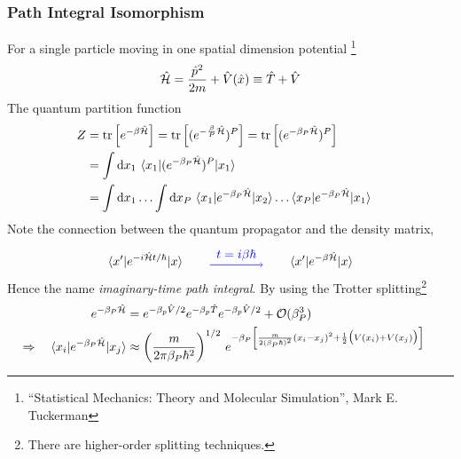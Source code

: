 \begin{frame}[allowframebreaks]
  \frametitle{Path Integral Isomorphism}
  For a single particle moving in one spatial dimension potential
  \footnote[frame]{
   ``Statistical Mechanics: Theory and Molecular Simulation'', Mark E. Tuckerman 
  }
  $$
  \hat{\cal H} = \frac{\hat{p}^2}{2m} + \hat{V}(\hat{x}) \equiv \hat{T} + \hat{V}
  $$
  The quantum partition function
  \begin{align*}
    \label{eq:quantum_partition_function}
    Z &= \operatorname{tr}\left[e^{-\beta\hat{\cal H}}\right]
        = \operatorname{tr}\left[(e^{-{\beta\over P}\hat{\cal H}})^P\right]
        = \operatorname{tr}\left[(e^{-{\beta_P}\hat{\cal H}})^P\right]
        \cr
    &= \int\mathrm{d}x_1\,
      \braket{ x_1| (e^{-\beta_P\hat{\cal H}})^P | x_1} \cr
    &= \int\mathrm{d}x_1\ldots\int\mathrm{d}x_P\,
      \braket{ x_1| e^{-\beta_P\hat{\cal H}} | x_2}
      \ldots
      \braket{ x_P| e^{-\beta_P\hat{\cal H}} | x_1}
  \end{align*}
  Note the connection between the quantum propagator and the density matrix,
  \begin{equation*}
    \label{eq:density_mat_and_propagator}
    \braket{ x'| e^{-i\hamil t/\hbar} | x}
    \qquad
    \tikz \draw [->=shealth, blue, line width=0.5pt] (0, 0) -- node[above,
    midway]{$t = i\beta\hbar$} (1.5, 0.0);
    \qquad
    \braket{ x'| e^{-\beta\hamil} | x}
  \end{equation*}
  Hence the name \emph{imaginary-time path integral}. By using the Trotter splitting\footnote[frame]{
    There are higher-order splitting techniques.
  }
  \begin{align*}
    e^{-\beta_P\hat{\cal H}} &=
    e^{-\beta_p\hat{V}/2}e^{-\beta_p\hat{T}}e^{-\beta_p\hat{V}/2} +
    {\cal O}(\beta_P^3) \cr
    \Rightarrow \quad \braket{ x_i| e^{-\beta_P\hat{\cal H}} | x_j} &\approx
    \left(m \over2\pi\beta_P\hbar^2\right)^{1/2}\,
    e^{
      -\beta_P
      \left[
         {m\over2(\beta_P\hbar)^2} (x_i - x_j)^2
                                                          + 
        {1\over2} \bigl(V(x_i) + V(x_j)\bigr)
      \right]
    }
  \end{align*}
  

\end{frame}
